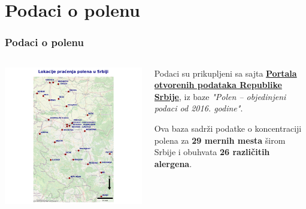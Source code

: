 \section{Podaci o polenu}

\begin{frame}
    \frametitle{Podaci o polenu}

    \begin{columns}[c]
        \begin{column}{0.5\textwidth}
            \centering
            \includegraphics[width=\textwidth]{images/mapa_lokacija.png}
        \end{column}

        \begin{column}{0.5\textwidth}
            \small
            Podaci su prikupljeni sa sajta 
            \href{https://data.gov.rs/sr/datasets/polen-objedinjeni-podatsi-od-2016-godine/}{\textbf{Portala otvorenih podataka Republike Srbije}}, 
            iz baze \textit{"Polen – objedinjeni podaci od 2016. godine"}.
            
            \vspace{0.3cm}

            Ova baza sadrži podatke o koncentraciji polena za 
            \textbf{29 mernih mesta} širom Srbije 
            i obuhvata \textbf{26 različitih alergena}.
        \end{column}
    \end{columns}

\end{frame}

